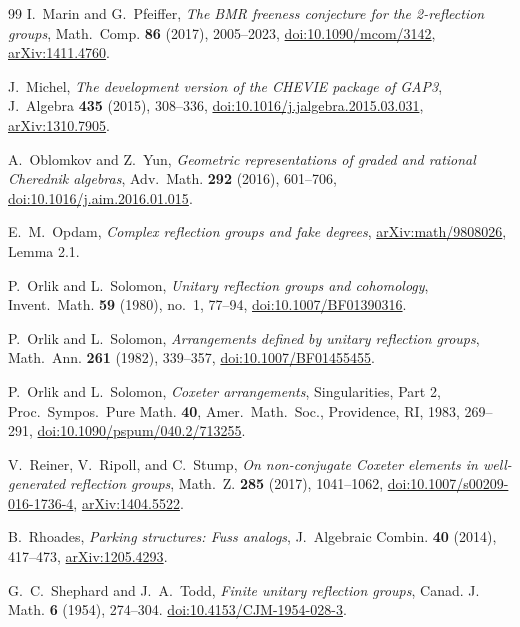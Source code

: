\documentclass[10pt,a4paper]{amsart}
\theoremstyle{definition}
\begin{document}
\begin{thebibliography}{99}
I.~Marin and G.~Pfeiffer,
\emph{The BMR freeness conjecture for the 2-reflection groups},
Math.~Comp. \textbf{86} (2017), 2005--2023,
\href{https://doi.org/10.1090/mcom/3142}{doi:10.1090/mcom/3142},
\href{https://arxiv.org/abs/1411.4760}{arXiv:1411.4760}.

J.~Michel,
\emph{The development version of the CHEVIE package of GAP3},
J.~Algebra \textbf{435} (2015), 308--336,
\href{https://doi.org/10.1016/j.jalgebra.2015.03.031}{doi:10.1016/j.jalgebra.2015.03.031},
\href{https://arxiv.org/abs/1310.7905}{arXiv:1310.7905}.

A.~Oblomkov and Z.~Yun,
\emph{Geometric representations of graded and rational Cherednik algebras},
Adv.~Math. \textbf{292} (2016), 601--706,
\href{https://doi.org/10.1016/j.aim.2016.01.015}{doi:10.1016/j.aim.2016.01.015}.

E.~M.~Opdam,
\emph{Complex reflection groups and fake degrees},
\href{https://arxiv.org/abs/math/9808026}{arXiv:math/9808026}, Lemma 2.1.

P.~Orlik and L.~Solomon,
\emph{Unitary reflection groups and cohomology},
Invent.~Math. \textbf{59} (1980), no.~1, 77--94,
\href{https://doi.org/10.1007/BF01390316}{doi:10.1007/BF01390316}.

P.~Orlik and L.~Solomon,
\emph{Arrangements defined by unitary reflection groups},
Math.~Ann. \textbf{261} (1982), 339--357,
\href{https://doi.org/10.1007/BF01455455}{doi:10.1007/BF01455455}.

P.~Orlik and L.~Solomon,
\emph{Coxeter arrangements},
Singularities, Part 2, Proc.~Sympos.~Pure Math. \textbf{40},
Amer.~Math.~Soc., Providence, RI, 1983, 269--291,
\href{https://doi.org/10.1090/pspum/040.2/713255}{doi:10.1090/pspum/040.2/713255}.

V.~Reiner, V.~Ripoll, and C.~Stump,
\emph{On non-conjugate Coxeter elements in well-generated reflection groups},
Math.~Z. \textbf{285} (2017), 1041--1062,
\href{https://doi.org/10.1007/s00209-016-1736-4}{doi:10.1007/s00209-016-1736-4},
\href{https://arxiv.org/abs/1404.5522}{arXiv:1404.5522}.

B.~Rhoades, \emph{Parking structures: Fuss analogs},
J.~Algebraic Combin. \textbf{40} (2014), 417--473,
\href{https://arxiv.org/abs/1205.4293}{arXiv:1205.4293}.

G.~C.~Shephard and J.~A.~Todd,
\emph{Finite unitary reflection groups},
Canad. J. Math. \textbf{6} (1954), 274--304.
\href{https://doi.org/10.4153/CJM-1954-028-3}{doi:10.4153/CJM-1954-028-3}.


\end{thebibliography}
\end{document}
